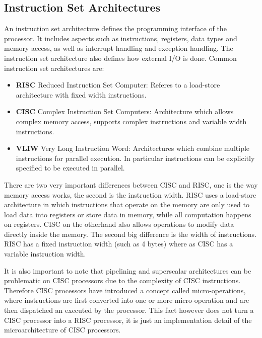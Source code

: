 \documentclass[a4paper,10pt]{article}
\begin{document}
\subsection{Instruction Set Architectures}
An instruction set architecture defines the programming interface of the processor. It includes aspects such as instructions, registers, 
data types and memory access, as well as interrupt handling and exception handling. The instruction set architecture also defines how 
external I/O is done. Common instruction set architectures are:
\begin{itemize}
 \item \textbf{RISC} Reduced Instruction Set Computer: Referes to a load-store architecture with fixed width instructions.
 \item \textbf{CISC} Complex Instruction Set Computers: Architecture which allows complex memory access, supports complex instructions
       and variable width instructions.
 \item \textbf{VLIW} Very Long Instruction Word: Architectures which combine multiple instructions for parallel execution. In particular
       instructions can be explicitly specified to be executed in parallel.
\end{itemize}

There are two very important differences between CISC and RISC, one is the way memory access works, the second is the instruction width. 
RISC uses a load-store architecture in which instructions that operate on the memory are only used to load data into registers or store 
data in memory, while all computation happens on registers. CISC on the otherhand also allows operations to modify data directly inside 
the memory. The second big difference is the width of instructions. RISC has a fixed instruction width (such as 4 bytes) where as CISC 
has a variable instruction width.

It is also important to note that pipelining and superscalar architectures can be problematic on CISC processors due to the complexity of 
CISC instructions. Therefore CISC processors have introduced a concept called micro-operations, where instructions are first converted 
into one or more micro-operation and are then dispatched an executed by the processor. This fact however does not turn a CISC processor 
into a RISC processor, it is just an implementation detail of the microarchitecture of CISC processors.
\end{document}
